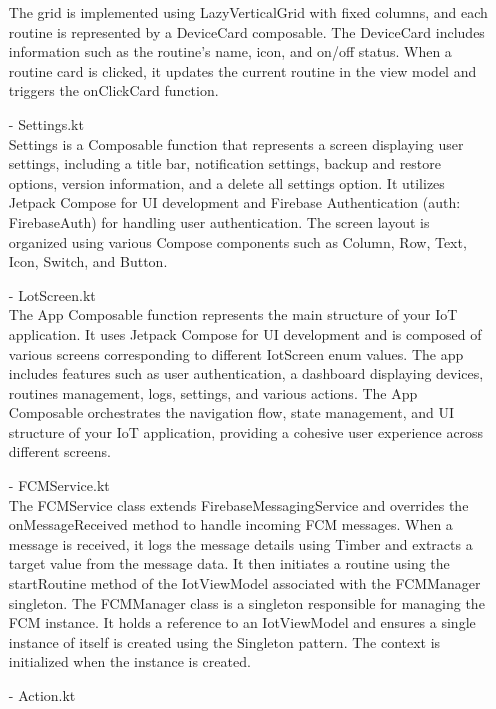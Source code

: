 \begin{enumerate}
            The grid is implemented using LazyVerticalGrid with fixed columns, and each routine is represented by a DeviceCard composable. The DeviceCard includes information such as the routine's name, icon, and on/off status. When a routine card is clicked, it updates the current routine in the view model and triggers the onClickCard function.\\
      \item[-] Settings.kt \\
            Settings is a Composable function that represents a screen displaying user settings, including a title bar, notification settings, backup and restore options, version information, and a delete all settings option. It utilizes Jetpack Compose for UI development and Firebase Authentication (auth: FirebaseAuth) for handling user authentication. The screen layout is organized using various Compose components such as Column, Row, Text, Icon, Switch, and Button.\\
      \item[-] LotScreen.kt \\
            The App Composable function represents the main structure of your IoT application. It uses Jetpack Compose for UI development and is composed of various screens corresponding to different IotScreen enum values. The app includes features such as user authentication, a dashboard displaying devices, routines management, logs, settings, and various actions. The App Composable orchestrates the navigation flow, state management, and UI structure of your IoT application, providing a cohesive user experience across different screens.\\
      \item[-] FCMService.kt \\
            The FCMService class extends FirebaseMessagingService and overrides the onMessageReceived method to handle incoming FCM messages. When a message is received, it logs the message details using Timber and extracts a target value from the message data. It then initiates a routine using the startRoutine method of the IotViewModel associated with the FCMManager singleton.
            The FCMManager class is a singleton responsible for managing the FCM instance. It holds a reference to an IotViewModel and ensures a single instance of itself is created using the Singleton pattern. The context is initialized when the instance is created.\\
      \item[-] Action.kt\\

\end{enumerate}

